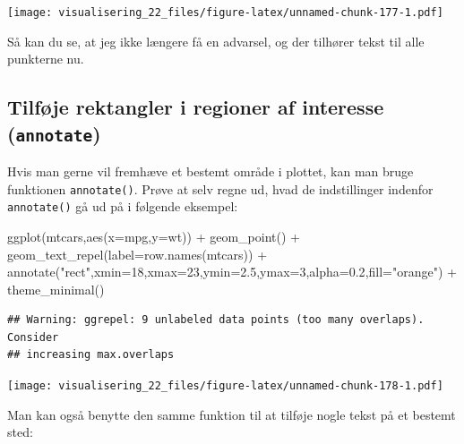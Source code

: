\documentclass[
]{book}
\newenvironment{Shaded}{\begin{snugshade}}{\end{snugshade}}
\newcommand{\AttributeTok}[1]{\textcolor[rgb]{0.77,0.63,0.00}{#1}}
\newcommand{\DecValTok}[1]{\textcolor[rgb]{0.00,0.00,0.81}{#1}}
\newcommand{\FloatTok}[1]{\textcolor[rgb]{0.00,0.00,0.81}{#1}}
\newcommand{\FunctionTok}[1]{\textcolor[rgb]{0.00,0.00,0.00}{#1}}
\newcommand{\NormalTok}[1]{#1}
\newcommand{\SpecialCharTok}[1]{\textcolor[rgb]{0.00,0.00,0.00}{#1}}
\newcommand{\StringTok}[1]{\textcolor[rgb]{0.31,0.60,0.02}{#1}}
\begin{document}
\texttt{[image: visualisering\_22\_files/figure-latex/unnamed-chunk-177-1.pdf]}

Så kan du se, at jeg ikke længere få en advarsel, og der tilhører tekst til alle punkterne nu.

\hypertarget{tilfuxf8je-rektangler-i-regioner-af-interesse-annotate}{%
\subsection{\texorpdfstring{Tilføje rektangler i regioner af interesse (\texttt{annotate})}{Tilføje rektangler i regioner af interesse (annotate)}}\label{tilfuxf8je-rektangler-i-regioner-af-interesse-annotate}}

Hvis man gerne vil fremhæve et bestemt område i plottet, kan man bruge funktionen \texttt{annotate()}. Prøve at selv regne ud, hvad de indstillinger indenfor \texttt{annotate()} gå ud på i følgende eksempel:

\begin{Shaded}
\begin{Highlighting}[]
\FunctionTok{ggplot}\NormalTok{(mtcars,}\FunctionTok{aes}\NormalTok{(}\AttributeTok{x=}\NormalTok{mpg,}\AttributeTok{y=}\NormalTok{wt)) }\SpecialCharTok{+} 
  \FunctionTok{geom\_point}\NormalTok{() }\SpecialCharTok{+}
  \FunctionTok{geom\_text\_repel}\NormalTok{(}\AttributeTok{label=}\FunctionTok{row.names}\NormalTok{(mtcars)) }\SpecialCharTok{+}
  \FunctionTok{annotate}\NormalTok{(}\StringTok{"rect"}\NormalTok{,}\AttributeTok{xmin=}\DecValTok{18}\NormalTok{,}\AttributeTok{xmax=}\DecValTok{23}\NormalTok{,}\AttributeTok{ymin=}\FloatTok{2.5}\NormalTok{,}\AttributeTok{ymax=}\DecValTok{3}\NormalTok{,}\AttributeTok{alpha=}\FloatTok{0.2}\NormalTok{,}\AttributeTok{fill=}\StringTok{"orange"}\NormalTok{) }\SpecialCharTok{+}
  \FunctionTok{theme\_minimal}\NormalTok{()}
\end{Highlighting}
\end{Shaded}

\begin{verbatim}
## Warning: ggrepel: 9 unlabeled data points (too many overlaps). Consider
## increasing max.overlaps
\end{verbatim}

\texttt{[image: visualisering\_22\_files/figure-latex/unnamed-chunk-178-1.pdf]}

Man kan også benytte den samme funktion til at tilføje nogle tekst på et bestemt sted:
\end{document}
